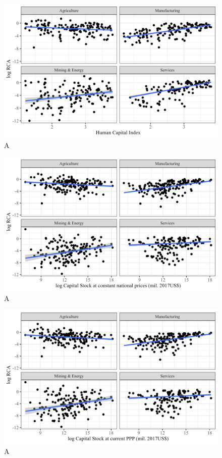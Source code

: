 \begin{figure}[!h]
    \caption{A}
    \includegraphics*[width = 0.8\linewidth]{../plots/rca_hc.png}

\end{figure}


\begin{figure}[!h]
    \caption{A}
    \includegraphics*[width = 0.8\linewidth]{../plots/rca_k_constant.png}

\end{figure}

\begin{figure}[!h]
    \caption{A}
    \includegraphics*[width = 0.8\linewidth]{../plots/rca_k_ppp.png}

\end{figure}

